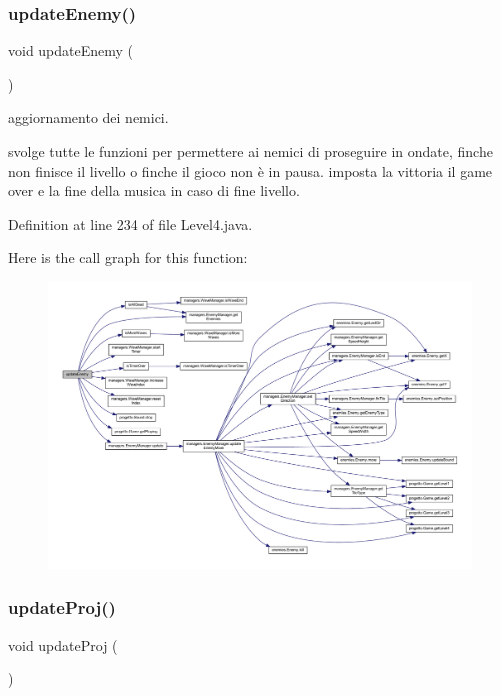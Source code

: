 \subsubsection{\texorpdfstring{update\+Enemy()}{updateEnemy()}}
{\footnotesize\ttfamily void update\+Enemy (\begin{DoxyParamCaption}{ }\end{DoxyParamCaption})}



aggiornamento dei nemici. 

svolge tutte le funzioni per permettere ai nemici di proseguire in ondate, finche non finisce il livello o finche il gioco non è in pausa. imposta la vittoria il game over e la fine della musica in caso di fine livello. 

Definition at line 234 of file Level4.\+java.

Here is the call graph for this function\+:\nopagebreak
\begin{figure}[H]
\begin{center}
\leavevmode
\includegraphics[width=350pt]{classscenes_1_1_level4_af005ec68c869a6acd5e833cba9330a50_cgraph}
\end{center}
\end{figure}
\mbox{\label{classscenes_1_1_level4_ac83c203b559f6fd0bb225744d7ccf854}} 
\subsubsection{\texorpdfstring{update\+Proj()}{updateProj()}}
{\footnotesize\ttfamily void update\+Proj (\begin{DoxyParamCaption}{ }\end{DoxyParamCaption})}



